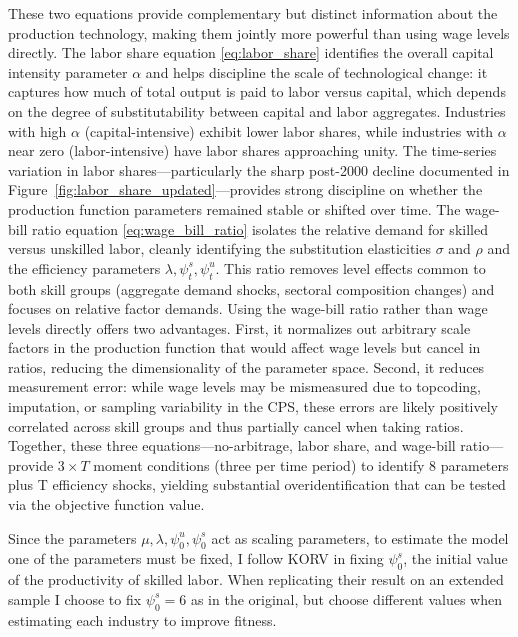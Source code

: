 \documentclass[12pt]{article}
\begin{document}
These two equations provide complementary but distinct information about the production technology, making them jointly more powerful than using wage levels directly. The labor share equation \eqref{eq:labor_share} identifies the overall capital intensity parameter $\alpha$ and helps discipline the scale of technological change: it captures how much of total output is paid to labor versus capital, which depends on the degree of substitutability between capital and labor aggregates. Industries with high $\alpha$ (capital-intensive) exhibit lower labor shares, while industries with $\alpha$ near zero (labor-intensive) have labor shares approaching unity. The time-series variation in labor shares---particularly the sharp post-2000 decline documented in Figure~\ref{fig:labor_share_updated}---provides strong discipline on whether the production function parameters remained stable or shifted over time. The wage-bill ratio equation \eqref{eq:wage_bill_ratio} isolates the relative demand for skilled versus unskilled labor, cleanly identifying the substitution elasticities $\sigma$ and $\rho$ and the efficiency parameters $\lambda, \psi^s_t, \psi^u_t$. This ratio removes level effects common to both skill groups (aggregate demand shocks, sectoral composition changes) and focuses on relative factor demands. Using the wage-bill ratio rather than wage levels directly offers two advantages. First, it normalizes out arbitrary scale factors in the production function that would affect wage levels but cancel in ratios, reducing the dimensionality of the parameter space. Second, it reduces measurement error: while wage levels may be mismeasured due to topcoding, imputation, or sampling variability in the CPS, these errors are likely positively correlated across skill groups and thus partially cancel when taking ratios. Together, these three equations---no-arbitrage, labor share, and wage-bill ratio---provide $3 \times T$ moment conditions (three per time period) to identify 8 parameters plus T efficiency shocks, yielding substantial overidentification that can be tested via the objective function value.

Since the parameters $\mu, \lambda, \psi^u_0, \psi^s_0$ act as scaling parameters, to estimate the model one of the parameters must be fixed, I follow KORV in fixing $\psi^s_0$, the initial value of the productivity of skilled labor. When replicating their result on an extended sample I choose to fix $\psi^s_0 = 6$ as in the original, but choose different values when estimating each industry to improve fitness.
\end{document}
